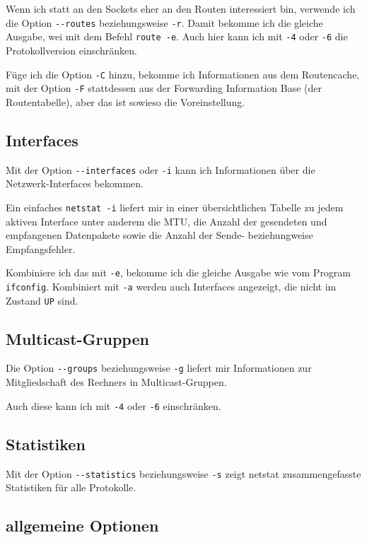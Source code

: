 \begin{normaltext}
  Wenn ich statt an den Sockets eher an den Routen interessiert bin, verwende
  ich die Option \verb?--routes? beziehungsweise \verb?-r?. Damit bekomme ich
  die gleiche Ausgabe, wei mit dem Befehl \verb?route -e?. Auch hier kann ich
  mit \verb?-4? oder \verb?-6? die Protokollversion einschränken.

  Füge ich die Option \verb?-C? hinzu, bekomme ich Informationen aus dem
  Routencache, mit der Option \verb?-F? stattdessen aus der Forwarding
  Information Base (der Routentabelle), aber das ist sowieso die
  Voreinstellung.

  \subsection*{Interfaces}
  \label{sec:netz-werkzeuge-netstat-interfaces}

  Mit der Option \verb?--interfaces? oder \verb?-i? kann ich Informationen
  über die Netzwerk-Interfaces bekommen.

  Ein einfaches \verb?netstat -i? liefert mir in einer übersichtlichen Tabelle
  zu jedem aktiven Interface unter anderem die MTU, die Anzahl der gesendeten
  und empfangenen Datenpakete sowie die Anzahl der Sende- beziehungweise
  Empfangsfehler.

  Kombiniere ich das mit \verb?-e?, bekomme ich die gleiche Ausgabe wie vom
  Program \verb?ifconfig?. Kombiniert mit \verb?-a? werden auch Interfaces
  angezeigt, die nicht im Zustand \verb?UP? sind.

  \subsection*{Multicast-Gruppen}
  \label{sec:netz-werkzeuge-netstat-groups}
  Die Option \verb?--groups? beziehungsweise \verb?-g? liefert mir
  Informationen zur Mitgliedschaft des Rechners in Multicast-Gruppen.

  Auch diese kann ich mit \verb?-4? oder \verb?-6? einschränken.

  \subsection*{Statistiken}
  \label{sec:netz-werkzeuge-netstat-statistics}

  Mit der Option \verb?--statistics? beziehungsweise \verb?-s? zeigt netstat
  zusammengefasste Statistiken für alle Protokolle.

  \subsection*{allgemeine Optionen}
  \label{sec:netz-werkzeuge-netstat-allgemein}


\end{normaltext}

